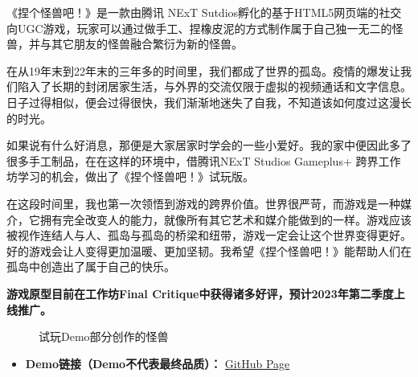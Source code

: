 


《捏个怪兽吧！》是一款由腾讯 NExT Sutdios孵化的基于HTML5网页端的社交向UGC游戏，玩家可以通过做手工、捏橡皮泥的方式制作属于自己独一无二的怪兽，并与其它朋友的怪兽融合繁衍为新的怪兽。

在从19年末到22年末的三年多的时间里，我们都成了世界的孤岛。疫情的爆发让我们陷入了长期的封闭居家生活，与外界的交流仅限于虚拟的视频通话和文字信息。日子过得相似，便会过得很快，我们渐渐地迷失了自我，不知道该如何度过这漫长的时光。

如果说有什么好消息，那便是大家居家时学会的一些小爱好。我的家中便因此多了很多手工制品，在在这样的环境中，借腾讯NExT Studios Gameplus+ 跨界工作坊学习的机会，做出了《捏个怪兽吧！》试玩版。

在这段时间里，我也第一次领悟到游戏的跨界价值。世界很严苛，而游戏是一种媒介，它拥有完全改变人的能力，就像所有其它艺术和媒介能做到的一样。游戏应该被视作连结人与人、孤岛与孤岛的桥梁和纽带，游戏一定会让这个世界变得更好。好的游戏会让人变得更加温暖、更加坚韧。我希望《捏个怪兽吧！》能帮助人们在孤岛中创造出了属于自己的快乐。

\textbf{游戏原型目前在工作坊Final Critique中获得诸多好评，预计2023年第二季度上线推广。}

\begin{figure}[H]
\centering  %
\caption{试玩Demo部分创作的怪兽}
\end{figure}




\begin{itemize}
    \item \textbf{Demo链接（Demo不代表最终品质）：}  \href{https://scyq.github.io/Gameplus/}{GitHub Page}
\end{itemize}